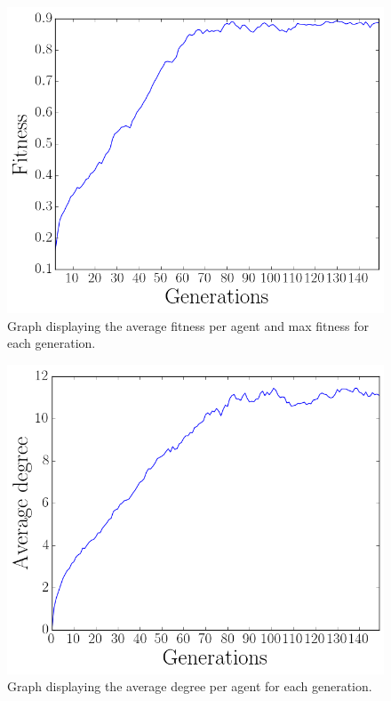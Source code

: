 \begin{figure}[htbp]
    \centering
    \includegraphics[scale=0.5]{fig/Results/Exp6/Fitness1}
    \caption{Graph displaying the average fitness per agent and max fitness for each generation.}
    \label{fig:Fitness6}
\end{figure}
\begin{figure}[htbp]
    \centering
    \includegraphics[scale=0.5]{fig/Results/Exp6/Degree1}
    \caption{Graph displaying the average degree per agent for each generation.}
    \label{fig:Degree6}
\end{figure}
